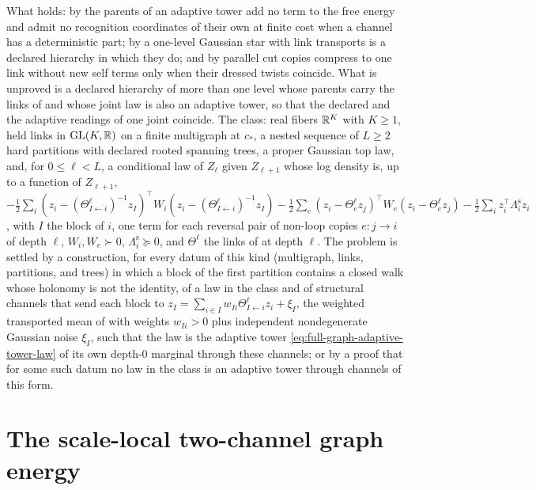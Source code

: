 What holds: by  the parents of an adaptive tower add no
term to the free energy and admit no recognition coordinates of their own at finite cost when a
channel has a deterministic part; by  a one-level Gaussian
star with link transports is a declared hierarchy in which they do; and by
 parallel cut copies compress to one link without new self
terms only when their dressed twists coincide. What is unproved is a declared hierarchy of more
than one level whose parents carry the links of  and whose
joint law is also an adaptive tower, so that the declared and the adaptive readings of one joint
coincide. The class: real fibers $\mathbb R^K$ with $K\ge1$, held links in $\mathrm{GL}(K,\mathbb R)$ on a finite
multigraph at $c_*$, a nested sequence of $L\ge2$ hard partitions with declared rooted spanning
trees, a proper Gaussian top law, and, for $0\le\ell<L$, a conditional law of $Z_\ell$ given
$Z_{\ell+1}$ whose log density is, up to a function of $Z_{\ell+1}$,
$-\tfrac12\sum_i(z_i-(\Theta^\ell_{I\leftarrow i})^{-1}z_I)^\top W_i(z_i-(\Theta^\ell_{I\leftarrow i})^{-1}z_I)
-\tfrac12\sum_e(z_i-\Theta^\ell_ez_j)^\top W_e(z_i-\Theta^\ell_ez_j)-\tfrac12\sum_iz_i^\top\Lambda^{\mathrm s}_iz_i$,
with $I$ the block of $i$, one term for each reversal pair of non-loop copies $e:j\to i$ of depth
$\ell$, $W_i,W_e\succ0$, $\Lambda^{\mathrm s}_i\succeq0$, and $\Theta^\ell$ the links of
 at depth $\ell$. The problem is settled by a construction,
for every datum of this kind (multigraph, links, partitions, and trees) in which a block of the
first partition contains a closed walk whose holonomy is not the identity, of a law in the class and of structural channels that send each block to
$z_I=\sum_{i\in I}w_{Ii}\Theta^\ell_{I\leftarrow i}z_i+\xi_I$, the weighted transported mean of
 with weights $w_{Ii}>0$ plus independent nondegenerate Gaussian
noise $\xi_I$, such that the law is the
adaptive tower \eqref{eq:full-graph-adaptive-tower-law} of its own depth-$0$ marginal through
these channels; or by a proof that for some such datum no law in the class is an adaptive tower
through channels of this form.

\section{The scale-local two-channel graph energy}
\label{sec:full-graph-vfe-scale-local}

